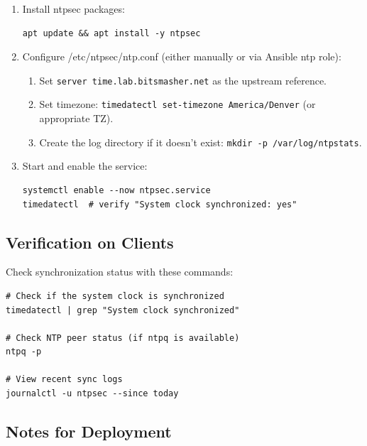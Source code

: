 \begin{enumerate}
    \item Install ntpsec packages:
    \begin{lstlisting}[style=mystyle]
apt update && apt install -y ntpsec
    \end{lstlisting}

    \item Configure /etc/ntpsec/ntp.conf (either manually or via Ansible ntp role):
    \begin{enumerate}
        \item Set \texttt{server time.lab.bitsmasher.net} as the upstream reference.
        
        \item Set timezone: \texttt{timedatectl set-timezone America/Denver} (or appropriate TZ).
        
        \item Create the log directory if it doesn't exist: \texttt{mkdir -p /var/log/ntpstats}.
    \end{enumerate}

    \item Start and enable the service:
    \begin{lstlisting}[style=mystyle]
systemctl enable --now ntpsec.service
timedatectl  # verify "System clock synchronized: yes"
    \end{lstlisting}
\end{enumerate}

\subsection{Verification on Clients}

Check synchronization status with these commands:

\begin{lstlisting}[style=mystyle]
# Check if the system clock is synchronized
timedatectl | grep "System clock synchronized"

# Check NTP peer status (if ntpq is available)
ntpq -p

# View recent sync logs
journalctl -u ntpsec --since today
    \end{lstlisting}

\subsection{Notes for Deployment}

